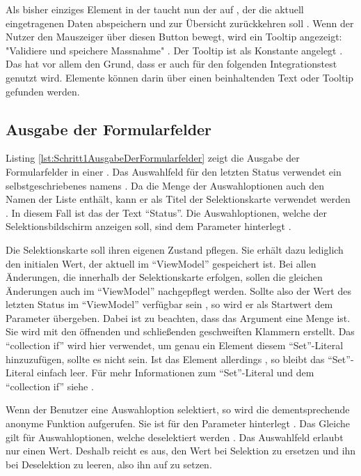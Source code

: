 Als bisher einziges Element in der   taucht nun der  auf ,
der die aktuell eingetragenen Daten abspeichern  und zur Übersicht zurückkehren soll .
Wenn der Nutzer den Mauszeiger über diesen Button bewegt,
wird ein Tooltip angezeigt: "Validiere und speichere Massnahme" .
Der Tooltip ist als Konstante angelegt .
Das hat vor allem den Grund,
dass er auch für den folgenden Integrationstest genutzt wird. Elemente können darin über einen beinhaltenden Text oder Tooltip gefunden werden.




\subsection{Ausgabe der Formularfelder}

Listing \ref{lst:Schritt1AusgabeDerFormularfelder} zeigt die Ausgabe der Formularfelder in einer  .
Das Auswahlfeld für den letzten Status verwendet ein selbstgeschriebenes  namens  .
Da die Menge der Auswahloptionen auch den Namen der Liste enthält, kann er als Titel der Selektionskarte verwendet werden . In diesem Fall ist das der Text \enquote{Status}.
Die Auswahloptionen, welche der Selektionsbildschirm anzeigen soll, sind dem Parameter  hinterlegt .

Die Selektionskarte soll ihren eigenen Zustand pflegen.
Sie erhält dazu lediglich den initialen Wert, der aktuell im \enquote{ViewModel} gespeichert ist.
Bei allen Änderungen, die innerhalb der Selektionskarte erfolgen, sollen die gleichen Änderungen auch im \enquote{ViewModel} nachgepflegt werden.
Sollte also der Wert des letzten Status im \enquote{ViewModel} verfügbar sein , so wird er als Startwert dem Parameter   übergeben.
Dabei ist zu beachten, dass das Argument eine Menge ist.
Sie wird mit den  öffnenden und schließenden geschweiften Klammern erstellt.
Das \enquote{collection if} wird hier verwendet, um genau ein Element diesem \enquote{Set}-Literal hinzuzufügen, sollte es nicht  sein.
Ist das Element allerdings , so bleibt das \enquote{Set}-Literal einfach leer.
Für mehr Informationen zum \enquote{Set}-Literal und dem \enquote{collection if} siehe .


Wenn der Benutzer eine Auswahloption selektiert, so  wird die dementsprechende anonyme Funktion aufgerufen.
Sie ist für den Parameter  hinterlegt .
Das Gleiche gilt für Auswahloptionen, welche deselektiert werden .
Das Auswahlfeld erlaubt nur einen Wert.
Deshalb reicht es aus, den Wert bei Selektion zu ersetzen und ihn bei Deselektion zu leeren, also ihn auf  zu setzen.


